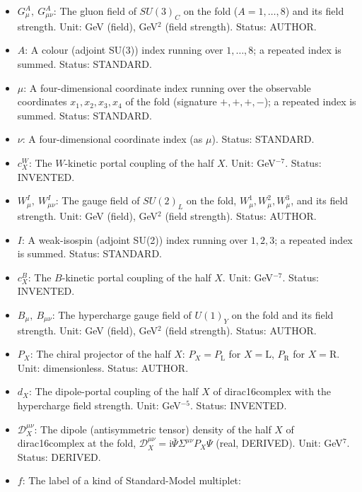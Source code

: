 \documentclass[
  10pt,
]{article}
\begin{document}
\begin{itemize}
  \(c^{G}_X\): The gluon-kinetic portal coupling of the half \(X\) of
  dirac16complex. Unit: GeV\(^{-7}\). Status: INVENTED.
\item
  \(G^A_\mu,\ G^A_{\mu\nu}\): The gluon field of \(SU(3)_C\) on the fold
  (\(A = 1, \dots, 8\)) and its field strength. Unit: GeV (field),
  GeV\(^2\) (field strength). Status: AUTHOR.
\item
  \(A\): A colour (adjoint SU(3)) index running over \(1, \dots, 8\); a
  repeated index is summed. Status: STANDARD.
\item
  \(\mu\): A four-dimensional coordinate index running over the
  observable coordinates \(x_1, x_2, x_3, x_4\) of the fold (signature
  \(+,+,+,-\)); a repeated index is summed. Status: STANDARD.
\item
  \(\nu\): A four-dimensional coordinate index (as \(\mu\)). Status:
  STANDARD.
\item
  \(c^{W}_X\): The \(W\)-kinetic portal coupling of the half \(X\).
  Unit: GeV\(^{-7}\). Status: INVENTED.
\item
  \(W^I_\mu,\ W^I_{\mu\nu}\): The gauge field of \(SU(2)_L\) on the
  fold, \(W^1_\mu, W^2_\mu, W^3_\mu\), and its field strength. Unit: GeV
  (field), GeV\(^2\) (field strength). Status: AUTHOR.
\item
  \(I\): A weak-isospin (adjoint SU(2)) index running over \(1, 2, 3\);
  a repeated index is summed. Status: STANDARD.
\item
  \(c^{B}_X\): The \(B\)-kinetic portal coupling of the half \(X\).
  Unit: GeV\(^{-7}\). Status: INVENTED.
\item
  \(B_\mu,\ B_{\mu\nu}\): The hypercharge gauge field of \(U(1)_Y\) on
  the fold and its field strength. Unit: GeV (field), GeV\(^2\) (field
  strength). Status: AUTHOR.
\item
  \(P_X\): The chiral projector of the half \(X\):
  \(P_X = P_{\mathrm{L}}\) for \(X = \mathrm{L}\), \(P_{\mathrm{R}}\)
  for \(X = \mathrm{R}\). Unit: dimensionless. Status: AUTHOR.
\item
  \(d_X\): The dipole-portal coupling of the half \(X\) of
  dirac16complex with the hypercharge field strength. Unit:
  GeV\(^{-5}\). Status: INVENTED.
\item
  \(\mathcal{D}_X^{\mu\nu}\): The dipole (antisymmetric tensor) density
  of the half \(X\) of dirac16complex at the fold,
  \(\mathcal{D}_X^{\mu\nu} = \mathrm{i}\bar\Psi\Sigma^{\mu\nu}P_X\Psi\)
  (real, DERIVED). Unit: GeV\(^7\). Status: DERIVED.
\item
  \(f\): The label of a kind of Standard-Model multiplet:

\end{itemize}
\end{document}
